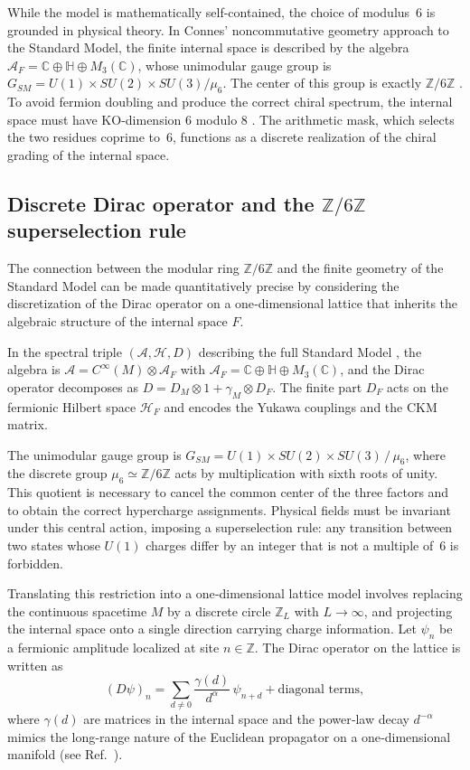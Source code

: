 \documentclass[11pt,a4paper]{article}
\newcommand{\Zmod}{\mathbb{Z}/6\mathbb{Z}}
\begin{document}
While the model is mathematically self-contained, the choice of modulus~6 is grounded in physical theory. In Connes' noncommutative geometry approach to the Standard Model, the finite internal space is described by the algebra $\mathcal{A}_F = \mathbb{C}\oplus\mathbb{H}\oplus M_3(\mathbb{C})$, whose unimodular gauge group is $G_{SM} = U(1)\times SU(2)\times SU(3)/\mu_6$. The center of this group is exactly $\mathbb{Z}/6\mathbb{Z}$ \cite{Connes2008}. To avoid fermion doubling and produce the correct chiral spectrum, the internal space must have KO-dimension $6$ modulo $8$ \cite{Chamseddine2007}. The arithmetic mask, which selects the two residues coprime to~6, functions as a discrete realization of the chiral grading of the internal space. 

\subsection{Discrete Dirac operator and the \texorpdfstring{$\mathbb{Z}/6\mathbb{Z}$}{Z/6Z} superselection rule}
\label{sec:ncg_discrete}

The connection between the modular ring $\Zmod$ and the finite geometry of the Standard Model can be made quantitatively precise by considering the discretization of the Dirac operator on a one‑dimensional lattice that inherits the algebraic structure of the internal space $F$. 

In the spectral triple $(\mathcal{A}, \mathcal{H}, D)$ describing the full Standard Model \cite{Connes2008,Chamseddine2007}, the algebra is $\mathcal{A}=C^\infty(M)\otimes \mathcal{A}_F$ with $\mathcal{A}_F=\mathbb{C}\oplus\mathbb{H}\oplus M_3(\mathbb{C})$, and the Dirac operator decomposes as $D = D_M\otimes 1 + \gamma_M\otimes D_F$. The finite part $D_F$ acts on the fermionic Hilbert space $\mathcal{H}_F$ and encodes the Yukawa couplings and the CKM matrix.

The unimodular gauge group is $G_{SM}=U(1)\times SU(2)\times SU(3)\,/\,\mu_6$, where the discrete group $\mu_6\simeq\Zmod$ acts by multiplication with sixth roots of unity. This quotient is necessary to cancel the common center of the three factors and to obtain the correct hypercharge assignments. Physical fields must be invariant under this central action, imposing a superselection rule: any transition between two states whose $U(1)$ charges differ by an integer that is not a multiple of~6 is forbidden.

Translating this restriction into a one‑dimensional lattice model involves replacing the continuous spacetime $M$ by a discrete circle $\mathbb{Z}_L$ with $L\to\infty$, and projecting the internal space onto a single direction carrying charge information. Let $\psi_n$ be a fermionic amplitude localized at site $n\in\mathbb{Z}$. The Dirac operator on the lattice is written as
\begin{equation}
(D\psi)_n = \sum_{d\neq 0} \frac{\gamma(d)}{d^{\alpha}} \, \psi_{n+d} + \text{diagonal terms},
\end{equation}
where $\gamma(d)$ are matrices in the internal space and the power‑law decay $d^{-\alpha}$ mimics the long‑range nature of the Euclidean propagator on a one‑dimensional manifold (see Ref.~\cite{Mirlin1996}).
\end{document}
